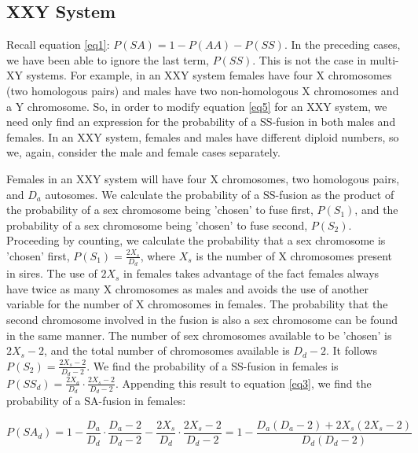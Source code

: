 \documentclass[12pt]{article}
\begin{document}
\subsection{XXY System}
Recall equation \ref{eq1}: $P(SA) = 1-P(AA)-P(SS)$. In the preceding cases, we have been able to ignore the last term, $P(SS)$.
This is not the case in multi-XY systems.
For example, in an XXY system females have four X chromosomes (two homologous pairs) and males have two non-homologous X chromosomes and a Y chromosome.
So, in order to modify equation \ref{eq5} for an XXY system, we need only find an expression for the probability of a SS-fusion in both males and females. 
In an XXY system, females and males have different diploid numbers, so we, again, consider the male and female cases separately. 

Females in an XXY system will have four X chromosomes, two homologous pairs, and $D_a$ autosomes. 
We calculate the probability of a SS-fusion as the product of the probability of a sex chromosome being 'chosen' to fuse first, $P(S_1)$, and the probability of a sex chromosome being 'chosen' to fuse second, $P(S_2)$. 
Proceeding by counting, we calculate the probability that a sex chromosome is 'chosen' first,
$P(S_1) = \frac{2X_s}{D_d} $, where $X_s$ is the number of X chromosomes present in sires. 
The use of $2X_s$ in females takes advantage of the fact females always have twice as many X chromosomes as males and avoids the use of another variable for the number of X chromosomes in females.
The probability that the second chromosome involved in the fusion is also a sex chromosome can be found in the same manner. 
The number of sex chromosomes available to be 'chosen' is $2X_s - 2 $, and the total number of chromosomes available is $D_d - 2$. 
It follows $P(S_2) = \frac{2X_s-2}{D_d-2}$. 
We find the probability of a SS-fusion in females is  $P(SS_d) = \frac{2X_a}{D_d} \cdot \frac{2X_s-2}{D_d-2}$.
Appending this result to equation \ref{eq3}, we find the probability of a SA-fusion in females:

    \begin{equation} \label{eq6}
        P(SA_d) = 1 - \frac{D_a}{D_d} \cdot \frac{D_a - 2}{D_d - 2} -  \frac{2X_s}{D_d} \cdot \frac{2X_s-2}{D_d-2} = 1 - \frac{D_a(D_a-2) + 2X_s(2X_s-2)}{D_d(D_d-2)}
    \end{equation}
\end{document}
